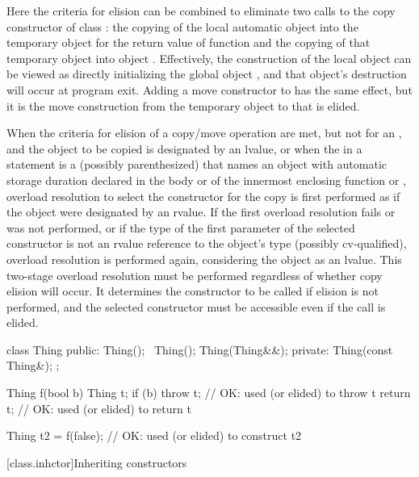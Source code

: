Here the criteria for elision can be combined to
eliminate two calls to the copy constructor of class
:
the copying of the local automatic object
into the temporary object for the return value of
function
and the copying of that temporary object into object
.
Effectively, the construction of the local object
can be viewed as directly initializing the global
object
,
and that object's destruction will occur at program
exit.
Adding a move constructor to  has the same effect, but it is the
move construction from the temporary object to  that is elided.
\exitexample

\pnum
When the criteria for elision of a copy/move operation are met,
but not for an ,
and the object
to be copied is designated by an lvalue,
or when the  in a  statement
is a (possibly parenthesized) 
that names an object with automatic storage duration declared in the body
or  of the innermost enclosing
function or ,
overload resolution to select the constructor
for the copy is first performed as if the object were designated by an rvalue.
If the first overload resolution fails or was not performed,
or if the type of the first parameter of the selected
constructor is not an rvalue reference to the object's type (possibly cv-qualified),
overload resolution is performed again, considering the object as an lvalue.
\enternote This two-stage overload resolution must be performed regardless
of whether copy elision will occur. It determines the constructor to be called if
elision is not performed, and the selected constructor must be accessible even if
the call is elided. \exitnote

\enterexample
\begin{codeblock}
class Thing {
public:
  Thing();
  ~Thing();
  Thing(Thing&&);
private:
  Thing(const Thing&);
};

Thing f(bool b) {
  Thing t;
  if (b)
    throw t;                    // OK:  used (or elided) to throw t
  return t;                     // OK:  used (or elided) to return t
}

Thing t2 = f(false);            // OK:  used (or elided) to construct t2
\end{codeblock}
\exitexample

[class.inhctor]{Inheriting constructors}%

